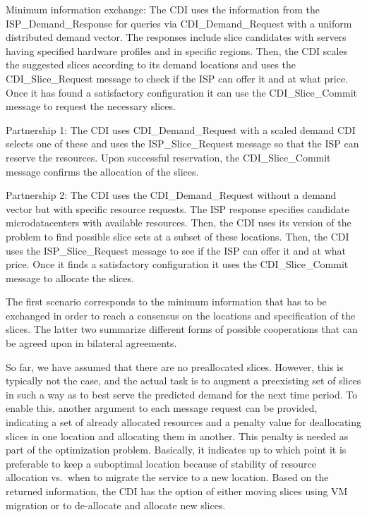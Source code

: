 \begin{description*}

\item [Minimum information exchange:] The CDI uses the information from the
ISP\_Demand\_Response for queries via CDI\_Demand\_Request with a uniform
distributed demand vector. The responses include slice candidates with servers
having specified hardware profiles and in specific regions. Then, the CDI
scales the suggested slices according to its demand locations and uses the
CDI\_Slice\_Request message to check if the ISP can offer it and at what price.
Once it has found a satisfactory configuration it can use the
CDI\_Slice\_Commit message to request the necessary slices.


\item [Partnership 1:] The CDI uses CDI\_Demand\_Request with a scaled demand
CDI selects one of these and uses the ISP\_Slice\_Request message so that the
ISP can reserve the resources. Upon successful reservation, the
CDI\_Slice\_Commit message confirms the allocation of the slices.

\item [Partnership 2:] The CDI uses the CDI\_Demand\_Request without a demand
vector but with specific resource requests. The ISP response specifies
candidate microdatacenters with available resources.  Then, the CDI uses its
version of the \sliceallocation problem to find possible slice sets at a subset
of these locations. Then, the CDI uses the ISP\_Slice\_Request message to see
if the ISP can offer it and at what price. Once it finds a satisfactory
configuration it uses the CDI\_Slice\_Commit message to allocate the slices.

\end{description*}

The first scenario corresponds to the minimum information that has to be
exchanged in order to reach a consensus on the locations and specification of
the slices. The latter two summarize different forms of possible cooperations
that can be agreed upon in bilateral agreements.

So far, we have assumed that there are no preallocated slices. However, this is
typically not the case, and the actual task is to augment a preexisting set of
slices in such a way as to best serve the predicted demand for the next time
period. To enable this, another argument to each message request can be
provided, indicating a set of already allocated resources and a penalty value
for deallocating slices in one location and allocating them in another.  This
penalty is needed as part of the optimization problem.  Basically, it indicates
up to which point it is preferable to keep a suboptimal location because of
stability of resource allocation vs.\ when to migrate the service to a new
location.  Based on the returned information, the CDI has the option of either
moving slices using VM migration or to de-allocate and allocate new slices.

